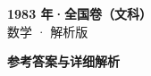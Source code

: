 \documentclass[zihao=-4, a4paper]{ctexart}
\begin{document}
\begin{center}
  {\Large\bfseries 1983 年·全国卷（文科）}\\[4pt]
  {\large 数学 · 解析版}
\end{center}
\medskip
{}

\clearpage
{}
\begin{center}{\Large\bfseries 参考答案与详细解析}\end{center}
\medskip

\end{document}
